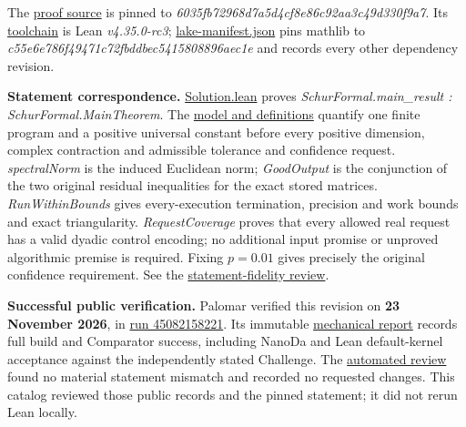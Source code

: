 \documentclass[11pt,a4paper]{article}
\makeatletter
\renewcommand{\subsection}{\Needspace{4\baselineskip}\@startsection{subsection}{2}{0pt}{9pt plus 1pt minus 1pt}{3pt}{\sffamily\bfseries\normalsize\color{ink}}}
\makeatother
\begin{document}
\subsection{Lean proof and verification
evidence}\label{lean-proof-and-verification-evidence}

The
\href{https://github.com/MColbrook/logarithmic-precision-schur/tree/6035fb72968d7a5d4cf8e86c92aa3c49d330f9a7}{proof
source} is pinned to \textit{6035fb72968d7a5d4cf8e86c92aa3c49d330f9a7}.
Its
\href{https://github.com/MColbrook/logarithmic-precision-schur/blob/6035fb72968d7a5d4cf8e86c92aa3c49d330f9a7/lean-toolchain}{toolchain}
is Lean \textit{v4.35.0-rc3};
\href{https://github.com/MColbrook/logarithmic-precision-schur/blob/6035fb72968d7a5d4cf8e86c92aa3c49d330f9a7/lake-manifest.json}{lake-manifest.json}
pins mathlib to \textit{c55e6e786f49471c72fbddbec5415808896aec1e} and
records every other dependency revision.

\textbf{Statement correspondence.}
\href{https://github.com/MColbrook/logarithmic-precision-schur/blob/6035fb72968d7a5d4cf8e86c92aa3c49d330f9a7/Solution.lean}{Solution.lean}
proves \textit{SchurFormal.main\_result : SchurFormal.MainTheorem}.
The
\href{https://github.com/MColbrook/logarithmic-precision-schur/blob/6035fb72968d7a5d4cf8e86c92aa3c49d330f9a7/Schur/Model.lean}{model
and definitions} quantify one finite program and a positive universal
constant before every positive dimension, complex contraction and
admissible tolerance and confidence request. \textit{spectralNorm} is
the induced Euclidean norm; \textit{GoodOutput} is the conjunction of
the two original residual inequalities for the exact stored matrices.
\textit{RunWithinBounds} gives every-execution termination, precision
and work bounds and exact triangularity. \textit{RequestCoverage} proves
that every allowed real request has a valid dyadic control encoding; no
additional input promise or unproved algorithmic premise is required.
Fixing \(p=0.01\) gives precisely the original confidence requirement.
See the
\href{https://github.com/MColbrook/logarithmic-precision-schur/blob/6035fb72968d7a5d4cf8e86c92aa3c49d330f9a7/reviews/main-theorem-fidelity.md}{statement-fidelity
review}.

\textbf{Successful public verification.} Palomar verified this revision
on \textbf{23 November 2026}, in
\href{https://github.com/PalomarRegistry/PalomarSubmission/actions/runs/45082158221}{run
45082158221}. Its immutable
\href{https://data.palomar-registry.org/evidence/PALOMAR-2026-11-23-000003-v1/dbc0fc5d5255ef85750629e81bcfc31df7d60e0f6c95f314df9044f1720275bc/mechanical-report.json}{mechanical
report} records full build and Comparator success, including NanoDa and
Lean default-kernel acceptance against the independently stated
Challenge. The
\href{https://data.palomar-registry.org/evidence/PALOMAR-2026-11-23-000003-v1/dbc0fc5d5255ef85750629e81bcfc31df7d60e0f6c95f314df9044f1720275bc/review.json}{automated
review} found no material statement mismatch and recorded no requested
changes. This catalog reviewed those public records and the pinned
statement; it did not rerun Lean locally.
\end{document}
